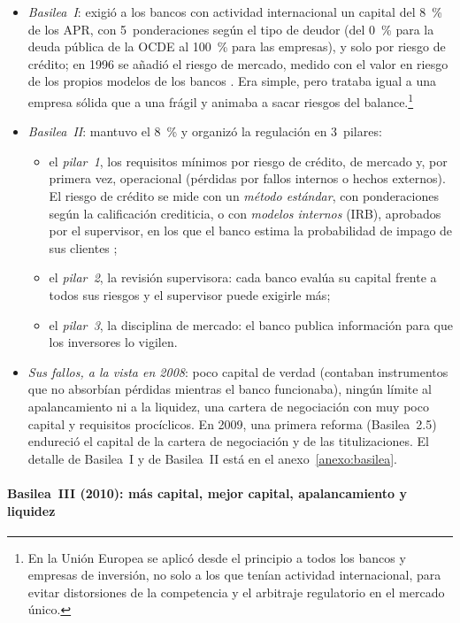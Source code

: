 \documentclass[11pt]{article}
\begin{document}
\begin{itemize}
\item \emph{Basilea~I}: exigió a los bancos con actividad internacional un capital del 8~\% de los APR, con 5~ponderaciones según el tipo de deudor (del 0~\% para la deuda pública de la OCDE al 100~\% para las empresas), y solo por riesgo de crédito; en 1996 se añadió el riesgo de mercado, medido con el valor en riesgo de los propios modelos de los bancos \nocite{BCBS2026Historia,BCBS1996MarketRisk}. Era simple, pero trataba igual a una empresa sólida que a una frágil y animaba a sacar riesgos del balance.\footnote{En la Unión Europea se aplicó desde el principio a todos los bancos y empresas de inversión, no solo a los que tenían actividad internacional, para evitar distorsiones de la competencia y el arbitraje regulatorio en el mercado único.}
\item \emph{Basilea~II}: mantuvo el 8~\% y organizó la regulación en 3~pilares:
  \begin{itemize}
  \item el \emph{pilar~1}, los requisitos mínimos por riesgo de crédito, de mercado y, por primera vez, operacional (pérdidas por fallos internos o hechos externos). El riesgo de crédito se mide con un \emph{método estándar}, con ponderaciones según la calificación crediticia, o con \emph{modelos internos} (IRB), aprobados por el supervisor, en los que el banco estima la probabilidad de impago de sus clientes ;
  \item el \emph{pilar~2}, la revisión supervisora: cada banco evalúa su capital frente a todos sus riesgos y el supervisor puede exigirle más;
  \item el \emph{pilar~3}, la disciplina de mercado: el banco publica información para que los inversores lo vigilen.
  \end{itemize}
\item \emph{Sus fallos, a la vista en 2008}: poco capital de verdad (contaban instrumentos que no absorbían pérdidas mientras el banco funcionaba), ningún límite al apalancamiento ni a la liquidez, una cartera de negociación con muy poco capital y requisitos procíclicos. En 2009, una primera reforma (Basilea~2.5) endureció el capital de la cartera de negociación y de las titulizaciones. El detalle de Basilea~I y de Basilea~II está en el anexo~\ref{anexo:basilea}.
\end{itemize}

\paragraph{Basilea~III (2010): más capital, mejor capital, apalancamiento y liquidez}
\end{document}

